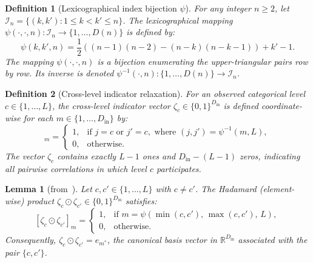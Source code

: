 \documentclass[default,sn-mathphys,Numbered]{sn-jnl}
\theoremstyle{thmstyleone}
\newtheorem{lemma}[theorem]{Lemma}
\theoremstyle{thmstylethree}
\newtheorem{definition}{Definition}
\theoremstyle{thmstyletwo}
\newcommand{\inp}{\text{in}}
\begin{document}
\begin{definition}[Lexicographical index bijection $\psi$]
\label{def:psi}
For any integer $n \ge 2$, let $\mathcal{I}_n = \{ (k, k') : 1 \le k < k' \le n \}$. The lexicographical mapping $\psi(\cdot, \cdot, n) : \mathcal{I}_n \to \{1, \ldots, D(n)\}$ is defined by:
\begin{equation}
\label{eq:psi_formula}
\psi(k, k', n) = \frac{1}{2}\left( (n-1)(n-2) - (n-k)(n-k-1) \right) + k' - 1.
\end{equation}
The mapping $\psi(\cdot, \cdot, n)$ is a bijection enumerating the upper-triangular pairs row by row. Its inverse is denoted $\psi^{-1}(\cdot, n) : \{1, \ldots, D(n)\} \to \mathcal{I}_n$.
\end{definition}

\begin{definition}[Cross-level indicator relaxation]
\label{def:cross_level}
For an observed categorical level $c \in \{1, \ldots, L\}$, the cross-level indicator vector $\zeta_c \in \{0, 1\}^{D_{\inp}}$ is defined coordinate-wise for each $m \in \{1, \ldots, D_{\inp}\}$ by:
\begin{equation}
[\zeta_c]_m =
\begin{cases}
1, & \text{if } j = c \text{ or } j' = c, \text{ where } (j, j') = \psi^{-1}(m, L), \\
0, & \text{otherwise.}
\end{cases}
\end{equation}
The vector $\zeta_c$ contains exactly $L-1$ ones and $D_{\inp} - (L - 1)$ zeros, indicating all pairwise correlations in which level $c$ participates.
\end{definition}

\begin{lemma}[from~\citep{saves2023high}]
\label{lem:hadamard}
Let $c, c' \in \{1, \ldots, L\}$ with $c \neq c'$. The Hadamard (element-wise) product $\zeta_c \odot \zeta_{c'} \in \{0, 1\}^{D_{\inp}}$ satisfies:
\begin{equation}
\label{eq:hadamard_select}
[\zeta_c \odot \zeta_{c'}]_m =
\begin{cases}
1, & \text{if } m = \psi(\min(c, c'),\, \max(c, c'),\, L), \\
0, & \text{otherwise.}
\end{cases}
\end{equation}
Consequently, $\zeta_c \odot \zeta_{c'} = e_{m^*}$, the canonical basis vector in $\mathbb{R}^{D_{\inp}}$ associated with the pair $\{c, c'\}$.
\end{lemma}
\end{document}
